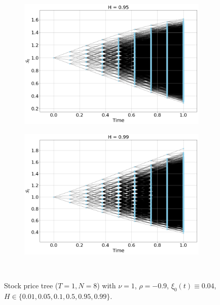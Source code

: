 \documentclass[12pt]{article}
\numberwithin{equation}{section}
\begin{document}
\begin{figure}[htb!]
\begin{center}
  \begin{subfigure}{0.5\textwidth}
    \centering
    \includegraphics[width=1.0\textwidth]{price_tree_H095}
    \label{fig:1}
  \end{subfigure}%
  \begin{subfigure}{0.5\textwidth}
    \centering
    \includegraphics[width=1.0\textwidth]{price_tree_H099}
    \label{fig:2}
  \end{subfigure}\\

\caption{Stock price tree ($T=1, N=8$) with $\nu=1$, $\rho=-0.9$, $\xi_0(t)\equiv 0.04$, $H\in\{0.01, 0.05, 0.1, 0.5, 0.95, 0.99\}$.}
\label{fig:pricetree1}
\end{center}
\end{figure}
\end{document}
